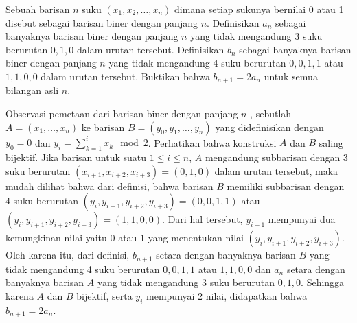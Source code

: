 \documentclass[11pt]{scrartcl}
\begin{document}
\begin{soaljawab}
    Sebuah barisan $n$ suku $(x_1,x_2,\dots,x_n)$ dimana setiap sukunya bernilai 0 atau 1 disebut sebagai barisan biner dengan panjang $n$. Definisikan $a_n$ sebagai banyaknya barisan biner dengan panjang $n$ yang tidak mengandung 3 suku berurutan $0,1,0$ dalam urutan tersebut. Definisikan $b_n$ sebagai banyaknya barisan biner dengan panjang $n$ yang tidak mengandung 4 suku berurutan $0,0,1,1$ atau $1,1,0,0$  dalam urutan tersebut. Buktikan bahwa $b_{n+1} = 2a_{n}$ untuk semua bilangan asli $n$.
    \begin{solusi}
        Observasi pemetaan dari barisan biner dengan panjang $n$ , sebutlah $A=(x_1, \dots, x_n)$ ke barisan $B=(y_0,y_1,\dots,y_n)$ yang didefinisikan dengan $y_0 = 0$ dan $y_i = \sum_{k=1}^{i} x_k \mod 2$. Perhatikan bahwa konstruksi $A$ dan $B$ saling bijektif. Jika barisan untuk suatu $1 \le i \le n$, $A$ mengandung subbarisan dengan 3 suku berurutan $(x_{i+1}, x_{i+2}, x_{i+3})=(0,1,0)$ dalam urutan tersebut, maka mudah dilihat bahwa dari definisi, bahwa barisan $B$ memiliki subbarisan dengan 4 suku berurutan $(y_i, y_{i+1}, y_{i+2}, y_{i+3})=(0,0,1,1)$ atau $(y_i, y_{i+1}, y_{i+2}, y_{i+3})=(1,1,0,0)$. Dari hal tersebut, $y_{i-1}$ mempunyai dua kemungkinan nilai yaitu $0$ atau $1$ yang menentukan nilai $(y_i, y_{i+1}, y_{i+2}, y_{i+3})$. Oleh karena itu, dari definisi, $b_{n+1}$ setara dengan banyaknya barisan $B$ yang tidak mengandung 4 suku berurutan $0,0,1,1$ atau $1,1,0,0$ dan $a_n$ setara dengan banyaknya barisan $A$ yang tidak mengandung 3 suku berurutan $0,1,0$. Sehingga karena $A$ dan $B$ bijektif, serta $y_i$ mempunyai 2 nilai, didapatkan bahwa $b_{n+1}=2a_n$.
    \end{solusi}
\end{soaljawab}
\end{document}

